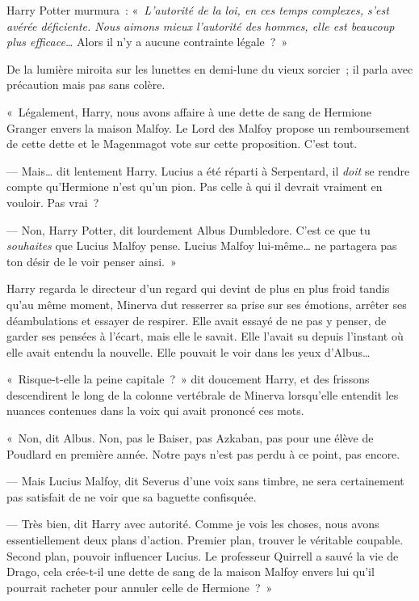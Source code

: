 Harry Potter murmura~: «~\emph{L'autorité de la loi, en ces temps complexes, s'est avérée déficiente. Nous aimons mieux l'autorité des hommes, elle est beaucoup plus efficace…} Alors il n'y a aucune contrainte légale~?~»

De la lumière miroita sur les lunettes en demi-lune du vieux sorcier~; il parla avec précaution mais pas sans colère.

«~Légalement, Harry, nous avons affaire à une dette de sang de Hermione Granger envers la maison Malfoy. Le Lord des Malfoy propose un remboursement de cette dette et le Magenmagot vote sur cette proposition. C'est tout.

--- Mais… dit lentement Harry. Lucius a été réparti à Serpentard, il \emph{doit} se rendre compte qu'Hermione n'est qu'un pion. Pas celle à qui il devrait vraiment en vouloir. Pas vrai~?

--- Non, Harry Potter, dit lourdement Albus Dumbledore. C'est ce que tu \emph{souhaites} que Lucius Malfoy pense. Lucius Malfoy lui-même… ne partagera pas ton désir de le voir penser ainsi.~»

Harry regarda le directeur d'un regard qui devint de plus en plus froid tandis qu'au même moment, Minerva dut resserrer sa prise sur ses émotions, arrêter ses déambulations et essayer de respirer. Elle avait essayé de ne pas y penser, de garder ses pensées à l'écart, mais elle le savait. Elle l'avait su depuis l'instant où elle avait entendu la nouvelle. Elle pouvait le voir dans les yeux d'Albus…

«~Risque-t-elle la peine capitale~?~» dit doucement Harry, et des frissons descendirent le long de la colonne vertébrale de Minerva lorsqu'elle entendit les nuances contenues dans la voix qui avait prononcé ces mots.

«~Non, dit Albus. Non, pas le Baiser, pas Azkaban, pas pour une élève de Poudlard en première année. Notre pays n'est pas perdu à ce point, pas encore.

--- Mais Lucius Malfoy, dit Severus d'une voix sans timbre, ne sera certainement pas satisfait de ne voir que sa baguette confisquée.

--- Très bien, dit Harry avec autorité. Comme je vois les choses, nous avons essentiellement deux plans d'action. Premier plan, trouver le véritable coupable. Second plan, pouvoir influencer Lucius. Le professeur Quirrell a sauvé la vie de Drago, cela crée-t-il une dette de sang de la maison Malfoy envers lui qu'il pourrait racheter pour annuler celle de Hermione~?~»

